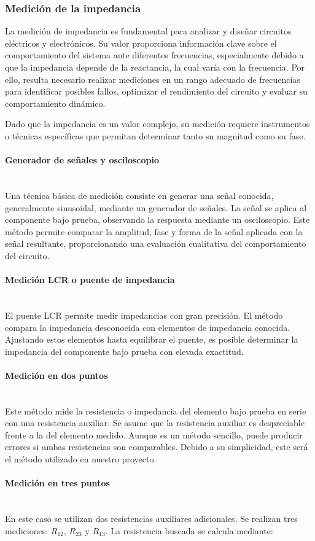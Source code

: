 \documentclass[11pt,a4paper]{article}
\newcommand{\myparagraph}[1]{\paragraph{#1}\mbox{}\\}
\begin{document}
\subsubsection{Medición de la impedancia}

La medición de impedancia es fundamental para analizar y diseñar circuitos eléctricos y electrónicos. Su valor proporciona información clave sobre el comportamiento del sistema ante diferentes frecuencias, especialmente debido a que la impedancia depende de la reactancia, la cual varía con la frecuencia. Por ello, resulta necesario realizar mediciones en un rango adecuado de frecuencias para identificar posibles fallos, optimizar el rendimiento del circuito y evaluar su comportamiento dinámico.

Dado que la impedancia es un valor complejo, su medición requiere instrumentos o técnicas específicas que permitan determinar tanto su magnitud como su fase.

\myparagraph{Generador de señales y osciloscopio}

Una técnica básica de medición consiste en generar una señal conocida, generalmente sinusoidal, mediante un generador de señales. La señal se aplica al componente bajo prueba, observando la respuesta mediante un osciloscopio. Este método permite comparar la amplitud, fase y forma de la señal aplicada con la señal resultante, proporcionando una evaluación cualitativa del comportamiento del circuito.

\myparagraph{Medición LCR o puente de impedancia}

El puente LCR permite medir impedancias con gran precisión. El método compara la impedancia desconocida con elementos de impedancia conocida. Ajustando estos elementos hasta equilibrar el puente, es posible determinar la impedancia del componente bajo prueba con elevada exactitud.

\myparagraph{Medición en dos puntos}

Este método mide la resistencia o impedancia del elemento bajo prueba en serie con una resistencia auxiliar. Se asume que la resistencia auxiliar es despreciable frente a la del elemento medido. Aunque es un método sencillo, puede producir errores si ambas resistencias son comparables. Debido a su simplicidad, este será el método utilizado en nuestro proyecto.

\myparagraph{Medición en tres puntos}

En este caso se utilizan dos resistencias auxiliares adicionales. Se realizan tres mediciones: \(R_{12}\), \(R_{23}\) y \(R_{13}\). La resistencia buscada se calcula mediante:
\end{document}
